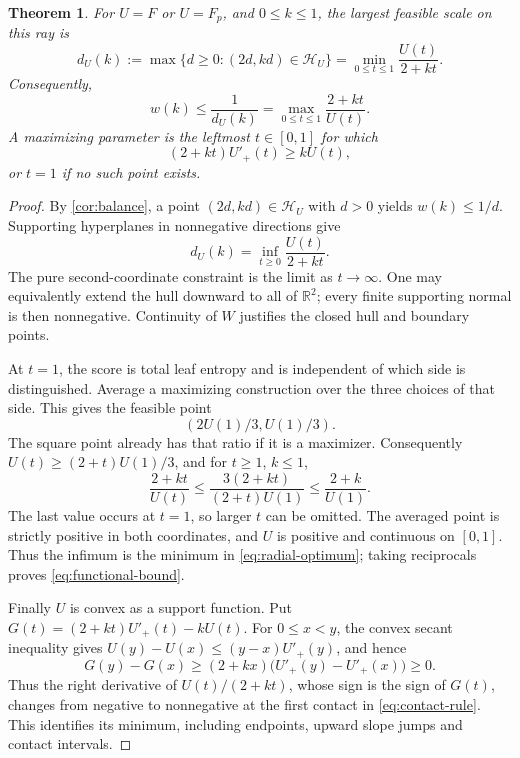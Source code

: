 \documentclass[11pt]{article}
\numberwithin{equation}{section}
\newtheorem{theorem}{Theorem}[section]
\theoremstyle{definition}
\theoremstyle{remark}
\begin{document}
\begin{theorem}\label{thm:shape-optimization}
For \(U=F\) or \(U=F_p\), and \(0\le k\le1\),
the largest feasible scale on this ray is
\begin{equation}\label{eq:radial-optimum}
 d_U(k):=\max\{d\ge0:(2d,kd)\in\mathcal H_U\}
       =\min_{0\le t\le1}\frac{U(t)}{2+kt}.
\end{equation}
Consequently,
\begin{equation}\label{eq:functional-bound}
 w(k)\le\frac1{d_U(k)}
      =\max_{0\le t\le1}\frac{2+kt}{U(t)}.
\end{equation}
A maximizing parameter is the leftmost \(t\in[0,1]\) for which
\begin{equation}\label{eq:contact-rule}
 (2+kt)U'_+(t)\ge kU(t),
\end{equation}
or \(t=1\) if no such point exists.
\end{theorem}

\begin{proof}
By \cref{cor:balance}, a point \((2d,kd)\in\mathcal H_U\) with \(d>0\) yields
\(w(k)\le1/d\).
Supporting hyperplanes in nonnegative directions give
\[
 d_U(k)
    =\inf_{t\ge0}\frac{U(t)}{2+kt}.
\]
The pure second-coordinate constraint is the limit as \(t\to\infty\).
One may equivalently extend the hull downward to all of \(\mathbb R^2\);
every finite supporting normal is then nonnegative.
Continuity of \(W\) justifies the closed hull and boundary points.

At \(t=1\), the score is total leaf entropy and is independent of
which side is distinguished.
Average a maximizing construction over the three choices of that side.
This gives the feasible point
\[
 (2U(1)/3,U(1)/3).
\]
The square point already has that ratio if it is a maximizer.
Consequently \(U(t)\ge(2+t)U(1)/3\), and for \(t\ge1\), \(k\le1\),
\[
 \frac{2+kt}{U(t)}
 \le \frac{3(2+kt)}{(2+t)U(1)}
 \le \frac{2+k}{U(1)}.
\]
The last value occurs at \(t=1\), so larger \(t\) can be omitted.
The averaged point is strictly positive in both coordinates, and
\(U\) is positive and continuous on \([0,1]\).
Thus the infimum is the minimum in \eqref{eq:radial-optimum}; taking
reciprocals proves \eqref{eq:functional-bound}.

Finally \(U\) is convex as a support function.
Put \(G(t)=(2+kt)U'_+(t)-kU(t)\).
For \(0\le x<y\), the convex secant inequality gives
\(U(y)-U(x)\le(y-x)U'_+(y)\), and hence
\[
 G(y)-G(x)
 \ge (2+kx)\bigl(U'_+(y)-U'_+(x)\bigr)\ge0.
\]
Thus the right derivative of \(U(t)/(2+kt)\), whose sign is the sign
of \(G(t)\), changes from negative to nonnegative at the first
contact in \eqref{eq:contact-rule}.  This identifies its minimum,
including endpoints, upward slope jumps and contact intervals.
\end{proof}
\end{document}
